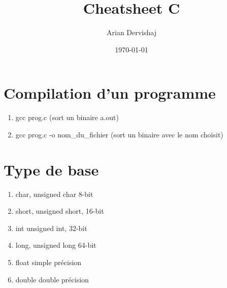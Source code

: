 \documentclass[a4paper, 12pt]{article}
\title{Cheatsheet C}
\author{Arian Dervishaj}
\date{\today}
\begin{document}
\maketitle
\pagebreak

\section{Compilation d'un programme}
\begin{enumerate}
    \item gcc prog.c (sort un binaire a.out)
    \item gcc prog.c -o nom\_du\_fichier (sort un binaire avec le nom choisit)
\end{enumerate}

\section{Type de base}
\begin{enumerate}
    \item char, unsigned char         8-bit
    \item short, unsigned short,      16-bit
    \item int unsigned int,           32-bit
    \item long, unsigned long         64-bit
    \item float                       simple précision
    \item double                      double précision

\end{enumerate}
\end{document}
